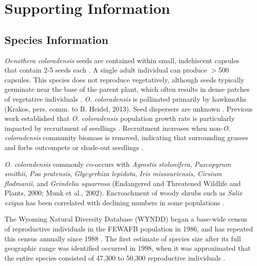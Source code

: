 \documentclass[12pt, letterpaper]{article}
\renewcommand{\thesection}{} %
\begin{document}


\newpage

\setcounter{figure}{0}
\setcounter{table}{0}
\setcounter{section}{0}
\setcounter{page}{1}


\newpage

\renewcommand{\thepage}{S\arabic{page}}
\renewcommand{\thesection}{S\arabic{section}}
\renewcommand{\thetable}{S\arabic{table}}
\renewcommand{\thefigure}{S\arabic{figure}}


\section*{Supporting Information}
\normalfont
\subsection{Species Information}
\textit{Oenothera coloradensis} seeds are contained within small, indehiscent capsules that contain 2-5 seeds each \cite{Burgess2005CapsuleColoradensis}. A single adult individual can produce $>$500 capsules. This species does not reproduce vegetatively, although seeds typically germinate near the base of the parent plant, which often results in dense patches of vegetative individuals \cite{Heidel202133-YearWyoming}. \textit{O. coloradensis} is pollinated primarily by hawkmoths (Krakos, pers. comm. to B. Heidel, 2013). Seed dispersers are unknown \cite{Floyd1998, Heidel202133-YearWyoming}. Previous work established that \textit{O. coloradensis} population growth rate is particularly impacted by recruitment of seedlings \cite{Floyd1998}. Recruitment increases when non-\textit{O. coloradensis} community biomass is removed, indicating that surrounding grasses and forbs outcompete or shade-out seedlings \cite{Munk2002RosetteSpecies}.
\nocite{krakosPersonalComm}

\textit{O. coloradensis} commonly co-occurs with \textit{Agrostis stolonifera}, \textit{Pascopyrum smithii}, \textit{Poa pratensis}, \textit{Glycyrrhiza lepidota}, \textit{Iris missouriensis}, \textit{Cirsium flodmanii}, and \textit{Grindelia squarrosa} (Endangered and Threatened Wildlife and Plants, 2000; Munk et al., 2002). Encroachment of woody shrubs such as \textit{Salix exigua} has been correlated with declining numbers in some populations \cite{Heidel202133-YearWyoming}.
\nocite{USFWS2019}

The Wyoming Natural Diversity Database (WYNDD) began a base-wide census of reproductive individuals in the FEWAFB population in 1986, and has repeated this census annually since 1988 \cite{Heidel202133-YearWyoming}. The first estimate of species size after its full geographic range was identified occurred in 1998, when it was approximated that the entire species consisted of 47,300 to 50,300 reproductive individuals \cite{Fertig2000-ow}.
\end{document}
